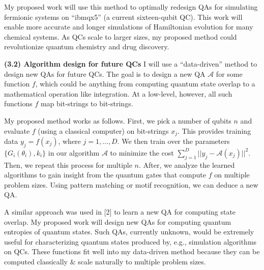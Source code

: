 \documentclass[12pt]{article}
\renewcommand{\>}{\rangle}
\newcommand{\tab}{\hspace*{0.8em}}
\begin{document}
\noindent  
\tab My proposed work will use this method to optimally redesign QAs for simulating fermionic systems on ``ibmqx5'' (a current sixteen-qubit QC). This work will enable more accurate and longer simulations of Hamiltonian evolution for many chemical systems. As QCs scale to larger sizes, my proposed method could revolutionize quantum chemistry and drug discovery.

\noindent
\textbf{(3.2) Algorithm design for future QCs} \tab I will use a ``data-driven'' method to design new QAs for future QCs. The goal is to design a new QA $\mathcal{A}$ for some function $f$, which could be anything from computing quantum state overlap to a mathematical operation like integration. At a low-level, however, all such functions $f$ map bit-strings to bit-strings. %

\noindent 
\tab My proposed method works as follows. First, we pick a number of qubits $n$ and evaluate $f$ (using a classical computer) on bit-strings $x_j$. This provides training data $y_j = f(x_j)$, where $j = 1, ..., D$. We then train over the parameters $\{G_i(\theta_i), k_i\}$ in our algorithm $\mathcal{A}$ to minimize the cost $\sum_{j = 1}^{D} ||y_j - \mathcal{A}(x_j)||^2$. Then, we repeat this process for multiple $n$. After, we analyze the learned algorithms to gain insight from the quantum gates that compute $f$ on multiple problem sizes. Using pattern matching or motif recognition, we can deduce a new QA.

\noindent
\tab A similar approach was used in [2] to learn a new QA for computing state overlap. My proposed work will design new QAs for computing quantum entropies of quantum states. Such QAs, currently unknown, would be extremely useful for characterizing quantum states produced by, e.g., simulation algorithms on QCs. These functions fit well into my data-driven method because they can be computed classically \& scale naturally to multiple problem sizes. %



\end{document}
